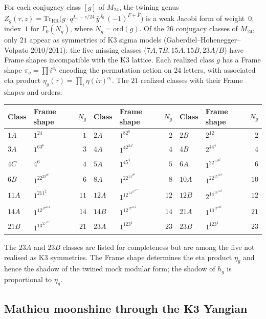 \begin{remark}
\label{rem:twining-genera}
For each conjugacy class $[g]$ of $M_{24}$, the twining genus
$Z_g(\tau,z) = \mathrm{Tr}_{\mathrm{RR}}\bigl(g \cdot
q^{L_0 - c/24}\,\bar{y}^{J_0}\,(-1)^{F+\bar{F}}\bigr)$ is a
weak Jacobi form of weight~$0$, index~$1$ for
$\Gamma_0(N_g)$, where $N_g = \mathrm{ord}(g)$. Of the $26$
conjugacy classes of $M_{24}$, only $21$ appear as symmetries of
K3 sigma models (Gaberdiel--Hohenegger--Volpato 2010/2011): the
five missing classes ($7A, 7B, 15A, 15B, 23A/B$) have Frame
shapes incompatible with the K3 lattice. Each realized class $g$
has a Frame shape $\pi_g = \prod i^{a_i}$ encoding the permutation
action on $24$ letters, with associated eta product
$\eta_g(\tau) = \prod_i \eta(i\tau)^{a_i}$.
The $21$ realized classes with their Frame shapes and orders:
\begin{center}
\scriptsize
\renewcommand{\arraystretch}{1.15}
\begin{tabular}{llr|llr|llr}
Class & Frame shape & $N_g$
& Class & Frame shape & $N_g$
& Class & Frame shape & $N_g$ \\
\hline
$1A$ & $1^{24}$ & $1$
& $2A$ & $1^82^8$ & $2$
& $2B$ & $2^{12}$ & $2$ \\
$3A$ & $1^63^6$ & $3$
& $4A$ & $1^42^24^4$ & $4$
& $4B$ & $2^44^4$ & $4$ \\
$4C$ & $4^6$ & $4$
& $5A$ & $1^45^4$ & $5$
& $6A$ & $1^22^13^26^2$ & $6$ \\
$6B$ & $1^22^23^16^1$ & $6$
& $8A$ & $1^22^14^18^2$ & $8$
& $10A$ & $1^22^15^110^1$ & $10$ \\
$11A$ & $1^211^2$ & $11$
& $12A$ & $1^12^14^13^16^112^1$ & $12$
& $12B$ & $2^14^16^112^1$ & $12$ \\
$14A$ & $1^12^17^114^1$ & $14$
& $14B$ & $1^12^17^114^1$ & $14$
& $21A$ & $1^13^17^121^1$ & $21$ \\
$21B$ & $1^13^17^121^1$ & $21$
& $23A$ & $1^123^1$ & $23$
& $23B$ & $1^123^1$ & $23$
\end{tabular}
\end{center}
The $23A$ and $23B$ classes are listed for completeness but are
among the five not realised as K3 symmetries. The Frame shape
determines the eta product $\eta_g$ and hence the shadow of the
twined mock modular form; the shadow of $h_g$ is proportional
to $\eta_g$.
\end{remark}

\subsection{Mathieu moonshine through the K3 Yangian}
\label{subsec:mathieu-yangian}

